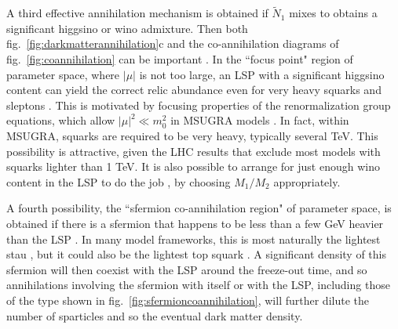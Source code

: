 \documentclass[12pt]{article}
\def\stilde{\widetilde}
\begin{document}
A third effective annihilation mechanism is obtained if $\stilde N_1$ 
mixes to obtains a significant higgsino or wino admixture. Then both 
fig.~\ref{fig:darkmatterannihilation}c and the co-annihilation diagrams of 
fig.~\ref{fig:coannihilation} can be important 
\cite{EdsjoGondolo}. In the ``focus point" region of parameter space, 
where $|\mu|$ is not too large, an LSP with a significant higgsino content 
can yield the correct relic abundance even for very heavy squarks and 
sleptons \cite{focuspointDM}. This is motivated by focusing properties of 
the renormalization group equations, which allow $|\mu|^2 \ll m_0^2$ in 
MSUGRA models \cite{hyperbolic,focuspoint}. In fact, within MSUGRA, squarks are required to be 
very heavy, typically several TeV. This possibility is attractive, given the 
LHC results that exclude most models with squarks lighter than 1 TeV.
It is also possible to arrange for just enough wino content in the LSP to do the 
job \cite{winocontentDM}, by choosing $M_1/M_2$ appropriately.

A fourth possibility, the ``sfermion co-annihilation region" of parameter 
space, is obtained if there is a sfermion that happens to be less than a 
few GeV heavier than the LSP \cite{GriestSeckel}. In many model 
frameworks, this is most naturally the lightest stau 
\cite{staucoannihilation}, but it could also be the lightest top squark 
\cite{stopcoannihilation}. A significant density of this sfermion will 
then coexist with the LSP around the freeze-out time, and so annihilations 
involving the sfermion with itself or with the LSP, including those of the 
type shown in fig.~\ref{fig:sfermioncoannihilation}, will further dilute 
the number of sparticles and so the eventual dark matter density.
\end{document}
